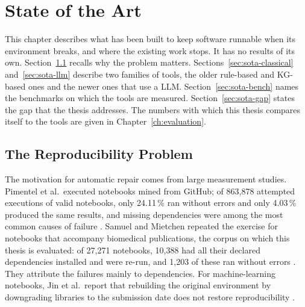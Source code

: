 \chapter{State of the Art}\label{ch:related-work}


This chapter describes what has been built to keep software runnable when its environment breaks, and where the existing work stops. It has no results of its own. Section~\ref{sec:sota-repro} recalls why the problem matters. Sections~\ref{sec:sota-classical} and~\ref{sec:sota-llm} describe two families of tools, the older rule-based and \ac{KG}-based ones and the newer ones that use a \ac{LLM}. Section~\ref{sec:sota-bench} names the benchmarks on which the tools are measured. Section~\ref{sec:sota-gap} states the gap that the thesis addresses. The numbers with which this thesis compares itself to the tools are given in Chapter~\ref{ch:evaluation}.

\section{The Reproducibility Problem}\label{sec:sota-repro}

The motivation for automatic repair comes from large measurement studies. Pimentel et al.\ executed notebooks mined from GitHub; of 863{,}878 attempted executions of valid notebooks, only 24.11\,\% ran without errors and only 4.03\,\% produced the same results, and missing dependencies were among the most common causes of failure \cite{pimentel2019large}. Samuel and Mietchen repeated the exercise for notebooks that accompany biomedical publications, the corpus on which this thesis is evaluated: of 27{,}271 notebooks, 10{,}388 had all their declared dependencies installed and were re-run, and 1{,}203 of these ran without errors \cite{samuel2024computational}. They attribute the failures mainly to dependencies. For machine-learning notebooks, Jin et al.\ report that rebuilding the original environment by downgrading libraries to the submission date does not restore reproducibility \cite{jin2026modernization}.

